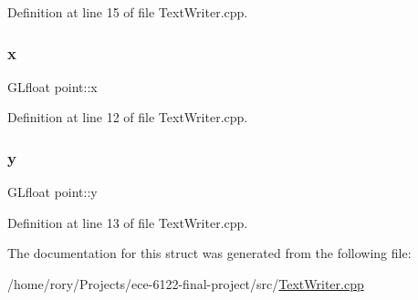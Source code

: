 Definition at line 15 of file Text\+Writer.\+cpp.

\mbox{\label{structpoint_a1b897e15553a9e09f9c1f23c08772e7d}} 
\subsubsection{\texorpdfstring{x}{x}}
{\footnotesize\ttfamily G\+Lfloat point\+::x}



Definition at line 12 of file Text\+Writer.\+cpp.

\mbox{\label{structpoint_a69a95a7bade398cc34ba8e4bfd579132}} 
\subsubsection{\texorpdfstring{y}{y}}
{\footnotesize\ttfamily G\+Lfloat point\+::y}



Definition at line 13 of file Text\+Writer.\+cpp.



The documentation for this struct was generated from the following file\+:\begin{DoxyCompactItemize}
\item 
/home/rory/\+Projects/ece-\/6122-\/final-\/project/src/\hyperlink{_text_writer_8cpp}{Text\+Writer.\+cpp}\end{DoxyCompactItemize}
